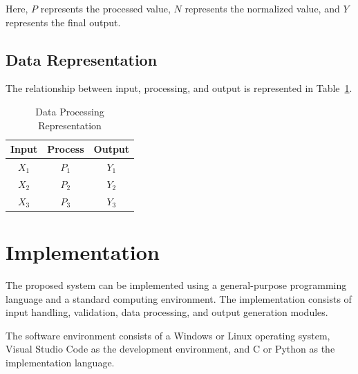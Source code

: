 \documentclass[conference]{IEEEtran}
\begin{document}
Here, $P$ represents the processed value, $N$ represents
the normalized value, and $Y$ represents the final output.


\subsection{Data Representation}

The relationship between input, processing, and output is
represented in Table~\ref{tab:data}.

\begin{table}[H]

\centering

\caption{Data Processing Representation}

\label{tab:data}

\begin{tabular}{c|c|c}

\toprule

Input & Process & Output \\

\midrule

$X_1$ & $P_1$ & $Y_1$ \\

$X_2$ & $P_2$ & $Y_2$ \\

$X_3$ & $P_3$ & $Y_3$ \\

\bottomrule

\end{tabular}

\end{table}


\section{Implementation}

The proposed system can be implemented using a general-purpose
programming language and a standard computing environment.
The implementation consists of input handling, validation,
data processing, and output generation modules.

The software environment consists of a Windows or Linux
operating system, Visual Studio Code as the development
environment, and C or Python as the implementation language.
\end{document}
